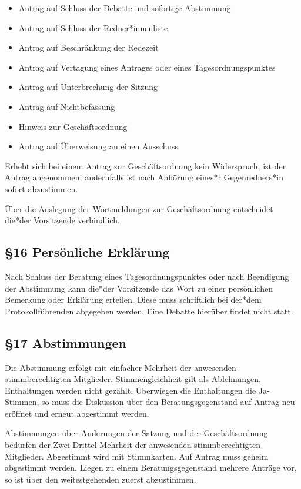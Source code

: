 \documentclass[12pt]{report}
\begin{document}
\begin{justify}
\begin{itemize}
  \item Antrag auf Schluss der Debatte und sofortige Abstimmung
  \item Antrag auf Schluss der Redner*innenliste
  \item Antrag auf Beschränkung der Redezeit
  \item Antrag auf Vertagung eines Antrages oder eines Tagesordnungspunktes
  \item Antrag auf Unterbrechung der Sitzung
  \item Antrag auf Nichtbefassung
  \item Hinweis zur Geschäftsordnung
  \item Antrag auf Überweisung an einen Ausschuss
\end{itemize}

Erhebt sich bei einem Antrag zur Geschäftsordnung kein Widerspruch, ist der
Antrag angenommen; andernfalls ist nach Anhörung eines*r Gegenredners*in sofort
abzustimmen.

Über die Auslegung der Wortmeldungen zur Geschäftsordnung entscheidet die*der Vorsitzende verbindlich.


\subsection*{§16 Persönliche Erklärung}
Nach Schluss der Beratung eines Tagesordnungspunktes oder nach Beendigung der Abstimmung kann die*der
Vorsitzende das Wort zu einer persönlichen Bemerkung oder Erklärung erteilen. Diese muss schriftlich bei
der*dem Protokollführenden abgegeben werden. Eine Debatte hierüber findet nicht statt.
\subsection*{§17 Abstimmungen}
Die Abstimmung erfolgt mit einfacher Mehrheit der anwesenden stimmberechtigten Mitglieder.
Stimmengleichheit gilt als Ablehnungen. Enthaltungen werden nicht gezählt. Überwiegen die Enthaltungen die 
Ja-Stimmen, so muss die Diskussion über den Beratungsgegenstand auf Antrag neu eröffnet und erneut
abgestimmt werden.

Abstimmungen über Änderungen der Satzung und der Geschäftsordnung bedürfen der
Zwei-Drittel-Mehrheit der anwesenden stimmberechtigten Mitglieder. Abgestimmt wird mit Stimmkarten.
Auf Antrag muss geheim abgestimmt werden.
Liegen zu einem Beratungsgegenstand mehrere Anträge vor, so ist über den weitestgehenden zuerst abzustimmen.


\end{justify}
\end{document}
